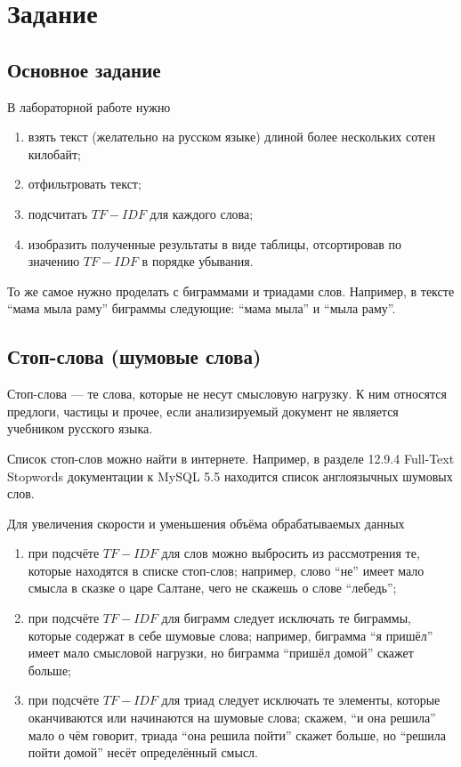 \section{Задание}

\subsection{Основное задание}
В лабораторной работе нужно
\begin{enumerate}
  \item
    взять текст (желательно на русском языке)
    длиной более нескольких сотен килобайт;
  \item
    отфильтровать текст;
  \item
    подсчитать $TF-IDF$ для каждого слова;
  \item
    изобразить полученные результаты в виде таблицы,
    отсортировав по значению $TF-IDF$ в порядке убывания.
\end{enumerate}

То же самое нужно проделать с биграммами и триадами слов.
Например, в тексте ``мама мыла раму'' биграммы следующие:
``мама мыла'' и ``мыла раму''.

\subsection{Стоп-слова (шумовые слова)}
Стоп-слова --- те слова, которые не несут смысловую нагрузку.
К ним относятся предлоги, частицы и прочее,
если анализируемый документ не является учебником русского языка.

Список стоп-слов можно найти в интернете.
Например, в разделе 12.9.4 Full-Text Stopwords документации к MySQL 5.5
\cite{Oracle} находится список англоязычных шумовых слов.

Для увеличения скорости и уменьшения объёма обрабатываемых данных
\begin{enumerate}
  \item
    при подсчёте $TF-IDF$ для слов можно выбросить из рассмотрения те,
    которые находятся в списке стоп-слов;
    например, слово ``не'' имеет мало смысла в сказке о царе Салтане,
    чего не скажешь о слове ``лебедь'';
  \item
    при подсчёте $TF-IDF$ для биграмм следует исключать те биграммы,
    которые содержат в себе шумовые слова;
    например, биграмма ``я пришёл'' имеет мало смысловой нагрузки,
    но биграмма ``пришёл домой'' скажет больше;
  \item
    при подсчёте $TF-IDF$ для триад следует исключать те элементы,
    которые оканчиваются или начинаются на шумовые слова;
    скажем, ``и она решила'' мало о чём говорит,
    триада ``она решила пойти'' скажет больше,
    но ``решила пойти домой'' несёт определённый смысл.
\end{enumerate}

